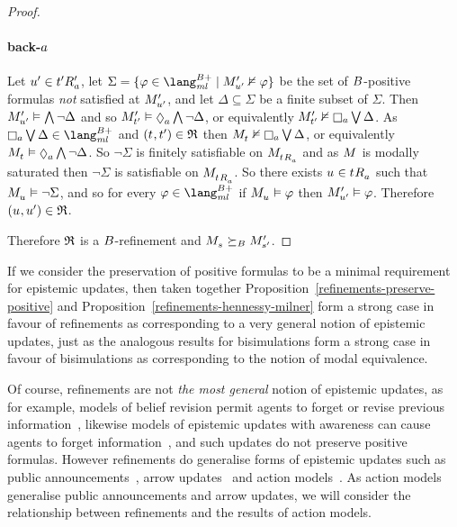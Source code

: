 \begin{proof}
\paragraph{back-$a$}
Let ${u}^{\prime} \in {{t}^{\prime}} {R^{\prime}_{a}}$, let $\Sigma = \{\phi \in \langMlPlusBs \mid \kPModelP{\kStateUP} \nentails \phi\}$ be the set of $B$-positive formulas {\em not} satisfied at ${M^{\prime}_{{u}^{\prime}}}$, and let $\Delta \subseteq \Sigma$ be a finite subset of $\Sigma$.
Then ${M^{\prime}_{{u}^{\prime}}} \vDash \bigwedge \lnot \Delta$ and so $\kPModelP{\kStateTP} \entails \possibleA \bigwedge \lnot \Delta$, or equivalently $\kPModelP{\kStateTP} \nentails \necessaryA \bigvee \Delta$.
As $\necessaryA \bigvee \Delta \in \langMlPlusBs$ and $(\kStateT, \kStateTP) \in \refinement$ then $\kPModel{\kStateT} \nentails \necessaryA \bigvee \Delta$, or equivalently $\kPModel{\kStateT} \entails \possibleA \bigwedge \lnot \Delta$.
So $\lnot \Sigma$ is finitely satisfiable on $\kPModel{\kSuccessorsA{\kStateT}}$ and as $\kModel$ is modally saturated then $\lnot \Sigma$ is satisfiable on $\kPModel{\kSuccessorsA{\kStateT}}$.
So there exists $\kStateU \in \kSuccessorsA{\kStateT}$ such that $\kPModel{\kStateU} \entails \lnot \Sigma$, and so for every $\phi \in \langMlPlusBs$ if $\kPModel{\kStateU} \entails \phi$ then ${M^{\prime}_{{u}^{\prime}}} \vDash \varphi$.
Therefore $(\kStateU, \kStateUP) \in \refinement$.

Therefore $\mathfrak{R}$ is a $B$-refinement and $\kPModel{\kStateS} \simulatesBs \kPModelP{\kStateSP}$.
\end{proof}

If we consider the preservation of positive formulas to be a minimal requirement for epistemic updates, then taken together Proposition~\ref{refinements-preserve-positive} and Proposition~\ref{refinements-hennessy-milner} form a strong case in favour of refinements as corresponding to a very general notion of epistemic updates, just as the analogous results for bisimulations form a strong case in favour of bisimulations as corresponding to the notion of modal equivalence.

Of course, refinements are not {\em the most general} notion of epistemic updates, as for example, models of belief revision permit agents to forget or revise previous information~\cite{alchourron:1985}, likewise models of epistemic updates with awareness can cause agents to forget information~\cite{vanditmarsch:2012}, and such updates do not preserve positive formulas.
However refinements do generalise forms of epistemic updates such as public announcements~\cite{plaza:1989,gerbrandy:1997}, arrow updates~\cite{kooi:2011a} and action models~\cite{baltag:1999, baltag:2004}.
As action models generalise public announcements and arrow updates, we will consider the relationship between refinements and the results of action models.

